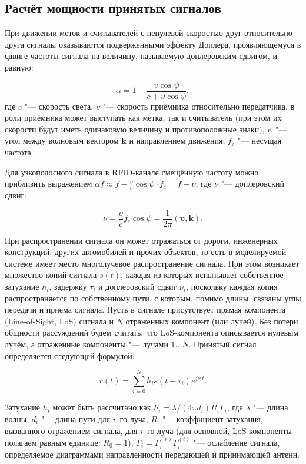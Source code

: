 \subsection{Расчёт мощности принятых сигналов}

При движении меток и считывателей с ненулевой скоростью друг относительно друга сигналы оказываются подверженными эффекту Доплера, проявляющемуся в сдвиге частоты сигнала на величину, называемую доплеровским сдвигом, и равную:

$$
	\alpha = 1 - \frac{\upsilon \cos{\psi}}{c+\upsilon \cos{\psi}},
$$
где $c$ "--- скорость света, $\upsilon$ "--- скорость приёмника относительно передатчика, в роли приёмника может выступать как метка, так и считыватель (при этом их скорости будут иметь одинаковую величину и противоположные знаки), $\psi$ "--- угол между волновым вектором $\bm{k}$ и направлением движения, $f_c$ "--- несущая частота.

Для узкополосного сигнала в RFID-канале смещённую частоту можно приблизить выражением $\alpha f \approx f - \frac{\upsilon}{c}\cos{\psi} \cdot f_c = f - \nu$, где $\nu$ "--- доплеровский сдвиг:

$$
	\nu = \frac{\upsilon}{c} f_c\cos{\psi} = \frac{1}{2\pi}(\bm{\upsilon},\bm{k}).
$$

При распространении сигнала он может отражаться от дороги, инженерных конструкций, других автомобилей и прочих объектов, то есть в моделируемой системе имеет место многолучевое распространение сигнала. При этом возникает множество копий сигнала $s(t)$, каждая из которых испытывает собственное затухание $h_i$, задержку $\tau_i$ и доплеровский сдвиг $\nu_i$, поскольку каждая копия распространяется по собственному пути, с которым, помимо длины, связаны углы передачи и приема сигнала. Пусть в сигнале присутствует прямая компонента (Line-of-Sight, LoS) сигнала и $N$ отраженных компонент (или лучей). Без потери общности рассуждений будем считать, что LoS-компонента описывается нулевым лучём, а отраженные компоненты "--- лучами $1 \dots N$. Принятый сигнал определяется следующей формулой:

\begin{equation}
	r(t) = \sum\limits_{i=0}^{N} h_i s(t-\tau_i) e^{j\nu_i t}.
	\label{eq:ch2_rx_signal}
\end{equation}

Затухание $h_i$ может быть рассчитано как $h_i=\lambda/(4\pi d_i)R_i\Gamma_i$, где $\lambda$ "--- длина волны, $d_i$ "--- длина пути для $i$--го луча, $R_i$ "--- коэффициент затухания, вызванного отражением сигнала, для $i$--го луча (для основной, LoS-компоненты полагаем равным единице: $R_0=1$), $\Gamma_i = \Gamma_i^{(r)}\Gamma_i^{(t)}$ "--- ослабление сигнала, определяемое диаграммами направленности передающей и принимающей антенн.

